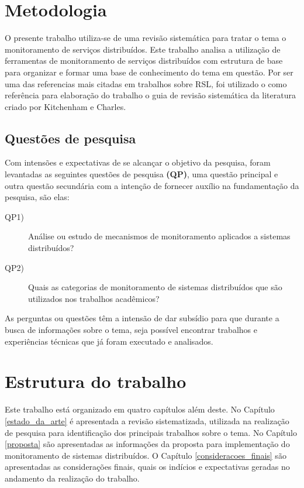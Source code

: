 \section{Metodologia}

O presente trabalho utiliza-se de uma  revisão sistemática para tratar o tema o monitoramento de serviços distribuídos. Este trabalho analisa a utilização de ferramentas de monitoramento de serviços distribuídos com estrutura de base para organizar e formar uma base de conhecimento do tema em questão. Por ser uma das referencias mais citadas em trabalhos sobre RSL, foi utilizado o como referência  para elaboração do trabalho o guia de revisão sistemática da literatura criado por Kitchenham e Charles\cite{kitchenham2007guidelines}.


\subsection{Questões de pesquisa}

Com intensões e expectativas de se alcançar o objetivo da pesquisa, foram levantadas as seguintes questões de pesquisa \textbf{(QP)}, uma questão principal e outra questão secundária com a intenção de fornecer auxílio na fundamentação da pesquisa, são elas: 

\begin{description}
		\item[QP1)] Análise ou estudo de mecanismos de monitoramento aplicados a sistemas distribuídos?
\item[QP2)] Quais as categorias de monitoramento de sistemas distribuídos que são utilizados nos trabalhos acadêmicos?
\end{description}

As perguntas ou questões têm a intensão de dar subsídio para que durante a busca de informações sobre o tema, seja possível encontrar trabalhos e experiências técnicas que já foram executado e analisados\cite{feltrim2004abordagem}.


\section{Estrutura do trabalho}

Este trabalho está organizado em quatro capítulos além deste. No Capítulo \ref{estado_da_arte} é apresentada a revisão sistematizada, utilizada na realização de pesquisa para identificação dos principais trabalhos sobre o tema. No Capítulo \ref{proposta} são apresentadas as informações da proposta para implementação do monitoramento de sistemas distribuídos. O Capítulo \ref{consideracoes_finais} são apresentadas as considerações finais, quais os indícios e expectativas geradas no andamento da realização do trabalho.